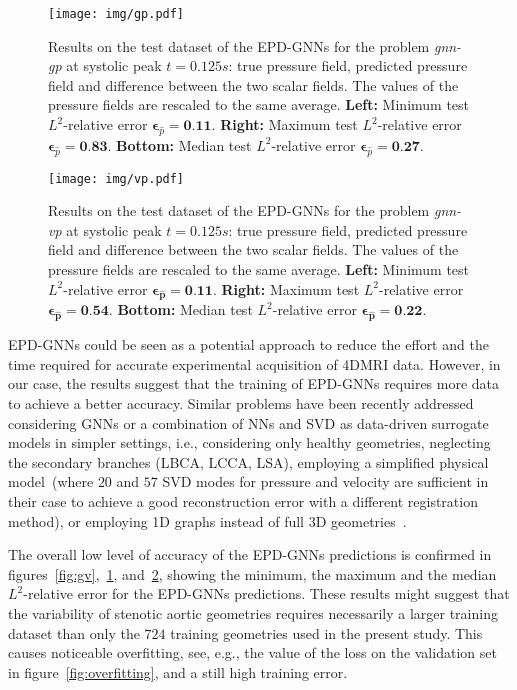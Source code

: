 \begin{figure}[!ht]
  \centering
  \texttt{[image: img/gp.pdf]}
  \caption{Results on the test dataset of the EPD-GNNs for the problem \textit{gnn-gp} at systolic peak $t=0.125s$: true pressure field, predicted pressure field and difference between the two scalar fields. The values of the pressure fields are rescaled to the same average. \textbf{Left: }Minimum test $L^2$-relative error $\boldsymbol{\epsilon}_{\widehat{p}}=\textbf{0.11}$. \textbf{Right: } Maximum test $L^2$-relative error $\boldsymbol{\epsilon}_{\widehat{p}}=\textbf{0.83}$. \textbf{Bottom: } Median test $L^2$-relative error $\boldsymbol{\epsilon}_{\widehat{p}}=\textbf{0.27}$.}
  \label{fig:gp}
\end{figure}

\begin{figure}[!ht]
  \centering
  \texttt{[image: img/vp.pdf]}
  \caption{Results on the test dataset of the EPD-GNNs for the problem \textit{gnn-vp} at systolic peak $t=0.125s$: true pressure field, predicted pressure field and difference between the two scalar fields. The values of the pressure fields are rescaled to the same average. \textbf{Left: }Minimum test $L^2$-relative error $\boldsymbol{\epsilon}_{\widehat{\mathbf p}}=\textbf{0.11}$. \textbf{Right: } Maximum test $L^2$-relative error $\boldsymbol{\epsilon}_{\widehat{\mathbf p}}=\textbf{0.54}$. \textbf{Bottom: } Median test $L^2$-relative error $\boldsymbol{\epsilon}_{\widehat{\mathbf p}}=\textbf{0.22}$.}
  \label{fig:vp}
\end{figure}

EPD-GNNs could be seen as a potential approach to reduce the effort and the time required for accurate experimental acquisition of 4DMRI data. However, in our case, the results suggest that the training of EPD-GNNs requires more data to achieve a better accuracy. 
Similar problems have been recently addressed considering GNNs or a combination of NNs and SVD as data-driven surrogate models in simpler settings, i.e., 
considering only healthy geometries, neglecting the secondary branches (LBCA, LCCA, LSA), employing a simplified physical model~\cite{pajaziti2023shape}(where $20$ and $57$ SVD modes for pressure and velocity are sufficient in their case to achieve a good reconstruction error with a different registration method), or employing 1D graphs instead of full 3D geometries~\cite{iacovelli2023novel,pegolotti2024learning}.

The overall low level of accuracy of the EPD-GNNs predictions is confirmed in figures~\ref{fig:gv},~\ref{fig:gp}, and~\ref{fig:vp}, showing the minimum, the maximum and the median $L^2$-relative error for the EPD-GNNs predictions.
These results might suggest that the variability of stenotic aortic geometries requires necessarily a larger training dataset
than only the $724$ training geometries used in the present study. 
This causes noticeable overfitting, see, e.g.,  the value of the loss on the validation set in figure~\ref{fig:overfitting}, and a still high training error.

